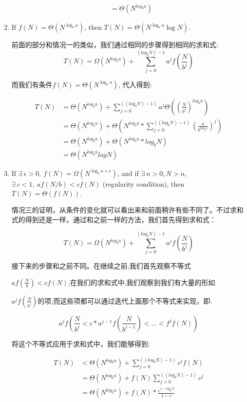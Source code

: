 \documentclass{article}
\begin{document}
\begin{enumerate}
\begin{align*}
            & = \Theta(N^{log_b a})        
    \end{align*}
    \item If $f(N)=\Theta(N^{\log_b a})$, then $T(N)=\Theta(N^{\log_b a}\log N)$. \par
    前面的部分和情况一的类似，我们通过相同的步骤得到相同的求和式:
    $$T(N) = \Omega (N^{log_b a}) + \sum_{j = 0}^{(log_b N)-1} a^j f(\frac{N}{b^j})$$\par
    而我们有条件$f(N)=\Theta(N^{\log_b a})$, 代入得到:\par
    \begin{align*}
        T(N)& = \Theta(N^{log_b a}) + \sum_{j=0}^{((log_b N) -1)} a^j \Theta((\frac{N}{b^j})^{log_b a})\\
            & = \Theta(N^{log_b a}) + \Theta(N^{log_b a} * \sum_{j=0}^{((log_b N) -1)} (\frac{a}{b^{log_b a}})^j)\\
            & = \Theta(N^{log_b a}) + \Theta(N^{log_b a} * log_b N)\\
            & = \Theta(N^{log_b a}log N)
    \end{align*}
    \item If $\exists\ \epsilon>0,\ f(N)=\Omega(N^{\log_b a+\epsilon})$, and if $\exists\ n>0, N>n$, $\exists\ c<1,\ af(N/b)<cf(N)$ (regularity condition), then $T(N)=\Theta(f(N))$.\par
    情况三的证明，从条件的变化就可以看出来和前面稍许有些不同了。不过求和式的得到还是一样，通过和之前一样的方法，我们首先得到求和式：\par
    $$T(N) = \Omega (N^{log_b a}) + \sum_{j = 0}^{(log_b N)-1} a^j f(\frac{N}{b^j})$$\par
    接下来的步骤和之前不同。在继续之前,我们首先观察不等式\par
    $af(\frac{N}{b}) < cf(N)$,在我们的求和式中,我们观察到我们有大量的形如\par
    $a^jf(\frac{N}{b^j})$的项,而这些项都可以通过迭代上面那个不等式来实现，即:\par
    $$a^jf(\frac{N}{b^j} < c*a^{j-1}f(\frac{N}{b^{j-1}}) < \dots < f^jf(N))$$\par
    将这个不等式应用于求和式中，我们能够得到:\par
    \begin{align*}
        T(N)& < \Theta(N^{log_b a}) + \sum_{j=0}^{((log_b N) -1)} c^jf(N)\\
            & = \Theta(N^{log_b a}) + f(N) \sum_{j=0}^{((log_b N) -1)}c^j\\
            & = \Theta(N^{log_b a}) + f(N) * \frac{c^{1-log_b N}}{1-c}\\

\end{align*}
\end{enumerate}
\end{document}

